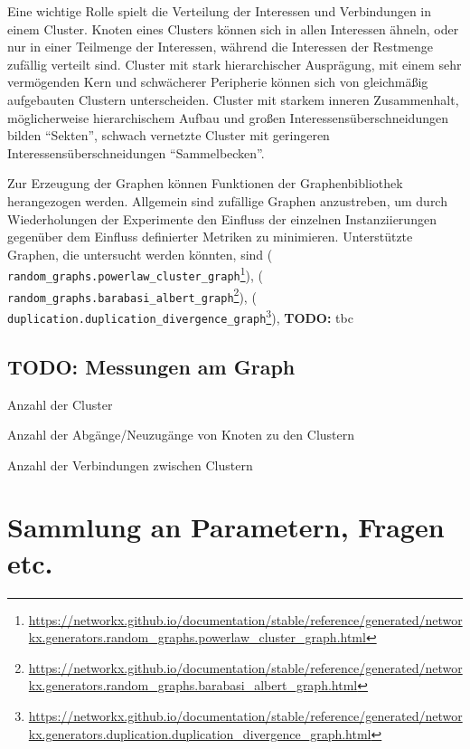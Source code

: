 \documentclass[11pt, a4paper]{scrartcl}
\newcommand{\nx}[1]{\texttt{#1}}
\newcommand*{\ToDo}[1]{{\color{ToDoColor}\textbf{TODO:} #1}}
\begin{document}
Eine wichtige Rolle spielt die Verteilung der Interessen und Verbindungen in einem Cluster. Knoten eines Clusters können sich in allen Interessen ähneln, oder nur in einer Teilmenge der Interessen, während die Interessen der Restmenge zufällig verteilt sind. Cluster mit stark hierarchischer Ausprägung, mit einem sehr vermögenden Kern und schwächerer Peripherie können sich von gleichmäßig aufgebauten Clustern unterscheiden. Cluster mit starkem inneren Zusammenhalt, möglicherweise hierarchischem Aufbau und großen Interessensüberschneidungen bilden "`Sekten"', schwach vernetzte Cluster mit geringeren Interessensüberschneidungen "`Sammelbecken"'.

Zur Erzeugung der Graphen können Funktionen der Graphenbibliothek \autocite{networkx} herangezogen werden. Allgemein sind zufällige Graphen anzustreben, um durch Wiederholungen der Experimente den Einfluss der einzelnen Instanziierungen gegenüber dem Einfluss definierter Metriken zu minimieren.
Unterstützte Graphen, die untersucht werden könnten, sind \autocite{Holme2002} (\nx{%
random\_graphs.powerlaw\_cluster\_graph}\footnote{\url{https://networkx.github.io/documentation/stable/reference/generated/networkx.generators.random_graphs.powerlaw_cluster_graph.html}}), \autocite{Barabasi509} (\nx{%
random\_graphs.barabasi\_albert\_graph}\footnote{\url{https://networkx.github.io/documentation/stable/reference/generated/networkx.generators.random_graphs.barabasi_albert_graph.html}}), \autocite{Ispolatov2005} (\nx{%
duplication.duplication\_divergence\_graph}\footnote{\url{https://networkx.github.io/documentation/stable/reference/generated/networkx.generators.duplication.duplication_divergence_graph.html}}), \ToDo{tbc}

\subsection{\ToDo{Messungen am Graph}}
Anzahl der Cluster

Anzahl der Abgänge/Neuzugänge von Knoten zu den Clustern

Anzahl der Verbindungen zwischen Clustern

\printbibliography

\appendix
\section{Sammlung an Parametern, Fragen etc.}
\end{document}
